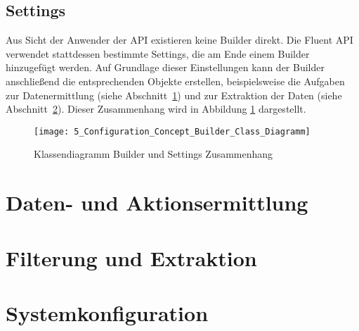 \subsection{Settings}
Aus Sicht der Anwender der API existieren keine Builder direkt. Die Fluent API verwendet stattdessen bestimmte Settings, die am Ende einem Builder hinzugefügt werden. Auf Grundlage dieser Einstellungen kann der Builder anschließend die entsprechenden Objekte erstellen, beispielsweise die Aufgaben zur Datenermittlung (siehe Abschnitt~\ref{sec:data_collection_concept}) und zur Extraktion der Daten (siehe Abschnitt~\ref{sec:data_extraction_concept}).  
Dieser Zusammenhang wird in Abbildung \ref{fig:builder_and_settings_cooperation} dargestellt.

\begin{figure}[H]
    \centering
    \texttt{[image: 5\_Configuration\_Concept\_Builder\_Class\_Diagramm]}
    \caption{Klassendiagramm Builder und Settings Zusammenhang}
    \label{fig:builder_and_settings_cooperation}
\end{figure}

\section{Daten- und Aktionsermittlung}
\label{sec:data_collection_concept}

\section{Filterung und Extraktion}
\label{sec:data_extraction_concept}

\section{Systemkonfiguration}
\label{sec:integration_concept}


